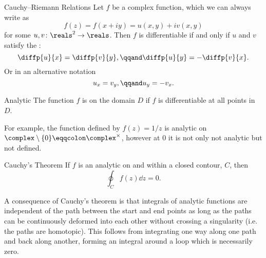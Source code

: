 \documentclass[fleqn]{NotesClass}
\begin{document}
    \begin{thm}{Cauchy--Riemann Relations}{}
        Let \(f\) be a complex function, which we can always write as
        \begin{equation}
            f(z) = f(x + iy) = u(x, y) + iv(x, y)
        \end{equation}
        for some \(u, v\colon \reals^2 \to \reals\).
        Then \(f\) is differentiable if and only if \(u\) and \(v\) satisfy the :
        \begin{equation}
            \diffp{u}{x} = \diffp{v}{y}, \qqand \diffp{u}{y} = -\diffp{v}{x}.
        \end{equation}
        Or in an alternative notation
        \begin{equation}
            u_x = v_y, \qqand u_y = - v_x.
        \end{equation}
    \end{thm}
    
    \begin{dfn}{Analytic}{}
        The function \(f\) is  on the domain \(D\) if \(f\) is differentiable at all points in \(D\).
    \end{dfn}
    
    For example, the function defined by \(f(z) = 1/z\) is analytic on \(\complex\setminus\{0\} \eqqcolon \complex^{\times}\), however at 0 it is not only not analytic but not defined.
    
    \begin{thm}{Cauchy's Theorem}{}
        If \(f\) is an analytic on and within a closed contour, \(C\), then
        \begin{equation}
            \oint_C f(z) \dd{z} = 0.
        \end{equation}
    \end{thm}
    
    A consequence of Cauchy's theorem is that integrals of analytic functions are independent of the path between the start and end points as long as the paths can be continuously deformed into each other without crossing a singularity (i.e. the paths are homotopic).
    This follows from integrating one way along one path and back along another, forming an integral around a loop which is necessarily zero.
    
\end{document}
